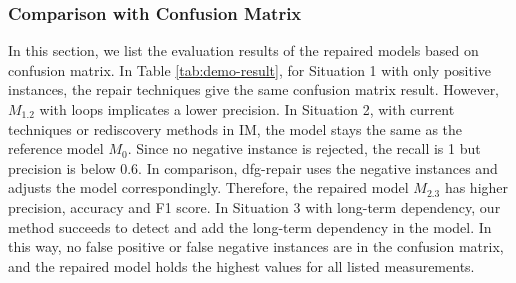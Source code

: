 \subsubsection{Comparison with Confusion Matrix}
In this section, we list the evaluation results of the repaired models based on confusion matrix. In Table \ref{tab:demo-result}, for Situation 1 with only positive instances, the repair techniques give the same confusion matrix result. However,  $M_{1.2}$  with loops implicates a lower precision. In Situation 2, with current techniques or rediscovery methods in IM, the model stays the same as the reference  model $M_0$. Since no negative instance is rejected, the recall is 1 but precision is below 0.6.  In comparison, dfg-repair uses the negative instances and adjusts the model correspondingly. Therefore, the repaired model $M_{2.3}$ has higher precision, accuracy and F1 score. In Situation 3 with long-term dependency, our method succeeds to detect and add the  long-term dependency in the model. In this way, no false positive or false negative instances are in the confusion matrix, and the repaired model holds the highest values for all listed measurements.
